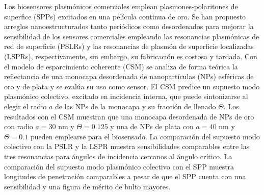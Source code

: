 

\begin{abstracts}        %
\vspace{-1em}

Los biosensores plasmónicos comerciales emplean plasmones-polaritones de superfice (SPPs) excitados en una película continua de oro. Se han propuesto arreglos nanoestructurados tanto periódicos como desordenados para mejorar la sensibilidad de los sensores comerciales empleando las resonancias plasmónicas de red de superficie (PSLRs) y  las resonancias de plasmón de superficie localizadas (LSPRs),  respectivamente, sin embargo, su fabricación es costosa y tardada. Con el modelo de esparcimiento coherente (CSM) se analiza de forma teórica la reflectancia de una monocapa desordenada de nanopartículas (NPs) esféricas de oro y de plata y se evalúa su uso como sensor. El CSM predice un supuesto modo plasmónico colectivo, excitado en incidencia interna, que puede sintonizarse al elegir el radio $a$ de las NPs de la monocapa y su fracción de llenado $\Theta$. Los resultados con el CSM muestran que una monocapa desordenada de NPs de oro con radio $a=30$ nm y $\Theta=0.125$ y una de NPs de plata con $a=40$ nm y $\Theta=0.1$ pueden emplearse para el biosensado. La comparación del supuesto modo colectivo con la PSLR y la LSPR muestra sensibilidades comparables entre las tres resonancias para ángulos de incidencia cercanos al ángulo crítico. La comparación del supuesto modo plasmónico colectivo con el SPP muestra longitudes de penetración comparables a pesar de que el SPP cuenta con una sensibilidad y una figura de mérito de bulto mayores.


\end{abstracts}
